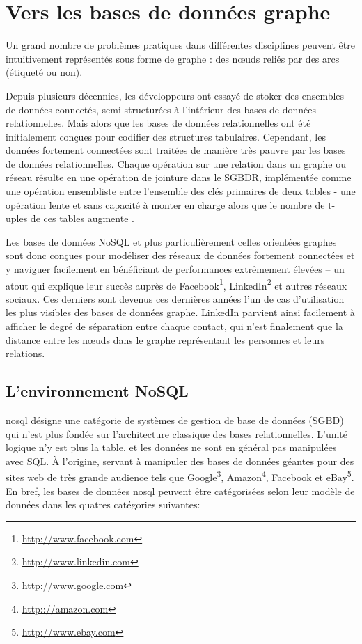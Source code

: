 \section{Vers les bases de données graphe}
\label{sec:graph-db}
\begin{text}
  Un grand nombre de problèmes pratiques dans différentes disciplines
  peuvent être intuitivement représentés sous forme de graphe : des
  nœuds reliés par des arcs (étiqueté ou non).

  Depuis plusieurs décennies, les développeurs ont essayé de stoker
  des ensembles de données connectés, semi-structurées à l'intérieur
  des bases de données relationnelles. Mais alors que les bases de
  données relationnelles ont été initialement conçues pour codifier
  des structures tabulaires. Cependant, les données fortement
  connectées sont traitées de manière très pauvre par les bases de
  données relationnelles. Chaque opération sur une relation dans un
  graphe ou réseau résulte en une opération de jointure dans le
  \acrshort{SGBDR}, implémentée comme une opération ensembliste entre
  l'ensemble des clés primaires de deux tables - une opération lente
  et sans capacité à monter en charge alors que le nombre de t-uples
  de ces tables augmente \cite{robinson2013graph}.

  Les bases de données NoSQL et plus particulièrement celles orientées
  graphes sont donc conçues pour modéliser des réseaux de données
  fortement connectées et y naviguer facilement en bénéficiant de
  performances extrêmement élevées – un atout qui explique leur succès
  auprès de Facebook\footnote{\url{http://www.facebook.com}},
  LinkedIn\footnote{\url{http://www.linkedin.com}} et autres réseaux
  sociaux. Ces derniers sont devenus ces dernières années l'un de cas
  d'utilisation les plus visibles des bases de données graphe.
  LinkedIn parvient ainsi facilement à afficher le degré de séparation
  entre chaque contact, qui n'est finalement que la distance entre les
  nœuds dans le graphe représentant les personnes et leurs relations.
\end{text}
  \newpage
  \subsection{L'environnement NoSQL}
  \label{sec:nosql}
  \acrshort{nosql} désigne une catégorie de systèmes de gestion de
  base de données (\acrshort{SGBD}) qui n'est plus fondée sur
  l'architecture classique des bases relationnelles. L'unité logique
  n'y est plus la table, et les données ne sont en général pas
  manipulées avec \textsc{SQL}. À l'origine, servant à manipuler des
  bases de données géantes pour des sites web de très grande audience
  tels que Google\footnote{\url{http://www.google.com}},
  Amazon\footnote{\url{http:://amazon.com}}, Facebook et
  eBay\footnote{\url{http://www.ebay.com}}. En bref, les bases de
  données \acrshort{nosql} peuvent être catégorisées selon leur modèle
  de données dans les quatres catégories suivantes:

